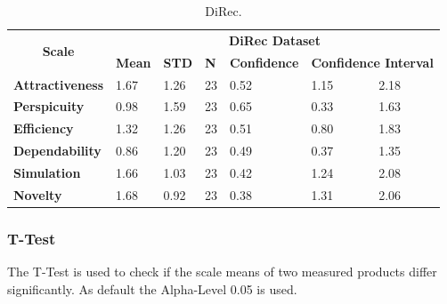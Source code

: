 \begin{table}[t]
\centering  
\begin{tabular}{|l|l|l|l|l|l|l|}
\hline
\multicolumn{1}{|c|}{\multirow{2}{*}{\textbf{Scale}}} & \multicolumn{6}{c|}{\textbf{DiRec Dataset}}                                                                         \\ \cline{2-7} 
\multicolumn{1}{|c|}{}                                & \textbf{Mean} & \textbf{STD} & \textbf{N} & \textbf{Confidence} & \multicolumn{2}{l|}{\textbf{Confidence Interval}} \\ \hline
\textbf{Attractiveness}                               & 1.67          & 1.26         & 23         & 0.52                & 1.15                    & 2.18                    \\ \hline
\textbf{Perspicuity}                                  & 0.98          & 1.59         & 23         & 0.65                & 0.33                    & 1.63                    \\ \hline
\textbf{Efficiency}                                   & 1.32          & 1.26         & 23         & 0.51                & 0.80                    & 1.83                    \\ \hline
\textbf{Dependability}                                & 0.86          & 1.20         & 23         & 0.49                & 0.37                    & 1.35                    \\ \hline
\textbf{Simulation}                                   & 1.66          & 1.03         & 23         & 0.42                & 1.24                    & 2.08                    \\ \hline
\textbf{Novelty}                                      & 1.68          & 0.92         & 23         & 0.38                & 1.31                    & 2.06                    \\ \hline
\end{tabular}
\caption{DiRec.}
\label{table:table52}
\end{table}

\subsubsection{T-Test} 
The T-Test is used to check if the scale means of two measured products differ
significantly. As default the Alpha-Level 0.05 is used.

